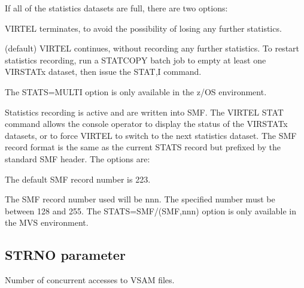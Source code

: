 \documentclass[letterpaper,10pt,english]{sphinxmanual}
\begin{document}
\sphinxAtStartPar
If all of the statistics datasets are full, there are two options:

\sphinxAtStartPar
{} \sphinxhyphen{} VIRTEL terminates, to avoid the possibility of losing any further statistics.

\sphinxAtStartPar
{} \sphinxhyphen{} (default) VIRTEL continues, without recording any further statistics. To restart statistics recording, run a STATCOPY batch job to empty at least one VIRSTATx dataset, then issue the STAT,I command.

\sphinxAtStartPar
The STATS=MULTI option is only available in the z/OS environment.

\sphinxAtStartPar
{} Statistics recording is active and are written into SMF. The VIRTEL STAT command allows the console operator to display the status of the VIRSTATx datasets, or to force VIRTEL to switch to the next statistics dataset. The SMF record format is the same as the current STATS record but prefixed by the standard SMF header. The options are:

\sphinxAtStartPar
{} \sphinxhyphen{} The default SMF record number is 223.

\sphinxAtStartPar
{} \sphinxhyphen{} The SMF record number used will be nnn. The specified number must be between 128 and 255. The STATS=SMF/(SMF,nnn) option is only available in the MVS environment.

\ignorespaces 

\subsection{STRNO parameter}
\label{\detokenize{Installation_Guide:strno-parameter}}\label{\detokenize{Installation_Guide:index-119}}
\begin{sphinxVerbatim}[commandchars=\\\{\}]
 
\end{sphinxVerbatim}

\sphinxAtStartPar
{} \sphinxhyphen{} Number of concurrent accesses to VSAM files.

\ignorespaces 
\end{document}
